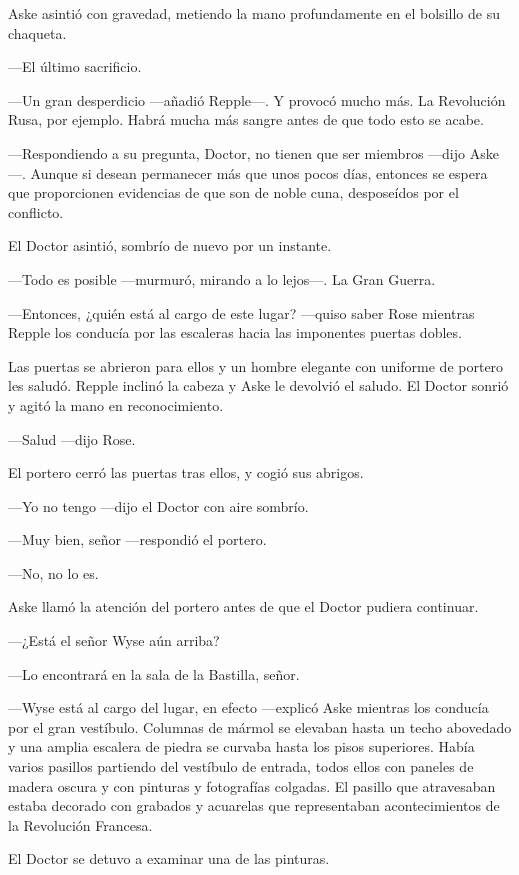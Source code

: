 {Aske asintió con gravedad, metiendo la mano profundamente en el
bolsillo de su chaqueta.}

{---El último sacrificio.}

{---Un gran desperdicio ---añadió Repple---. Y provocó mucho más. La
	Revolución Rusa, por ejemplo. Habrá mucha más sangre antes de que todo
esto se acabe.}

{---Respondiendo a su pregunta, Doctor, no tienen que ser miembros
	---dijo Aske---. Aunque si desean permanecer más que unos pocos días,
	entonces se espera que proporcionen evidencias de que son de noble cuna,
desposeídos por el conflicto.}

{El Doctor asintió, sombrío de nuevo por un instante.}

{---Todo es posible ---murmuró, mirando a lo lejos---. La Gran Guerra.}

{---Entonces, ¿quién está al cargo de este lugar? ---quiso saber Rose
	mientras Repple los conducía por las escaleras hacia las imponentes
puertas dobles.}

{Las puertas se abrieron para ellos y un hombre elegante con uniforme de
	portero les saludó. Repple inclinó la cabeza y Aske le devolvió el
saludo. El Doctor sonrió y agitó la mano en reconocimiento.}

{---Salud ---dijo Rose.}

{El portero cerró las puertas tras ellos, y cogió sus abrigos.}

{---Yo no tengo ---dijo el Doctor con aire sombrío.}

{---Muy bien, señor ---respondió el portero.}

{---No, no lo es.}

{Aske llamó la atención del portero antes de que el Doctor pudiera
continuar.}

{---¿Está el señor Wyse aún arriba?}

{---Lo encontrará en la sala de la Bastilla, señor.}

{---Wyse está al cargo del lugar, en efecto ---explicó Aske mientras los
	conducía por el gran vestíbulo. Columnas de mármol se elevaban hasta un
	techo abovedado y una amplia escalera de piedra se curvaba hasta los
	pisos superiores. Había varios pasillos partiendo del vestíbulo de
	entrada, todos ellos con paneles de madera oscura y con pinturas y
	fotografías colgadas. El pasillo que atravesaban estaba decorado con
	grabados y acuarelas que representaban acontecimientos de la Revolución
Francesa.}

{El Doctor se detuvo a examinar una de las pinturas.}

